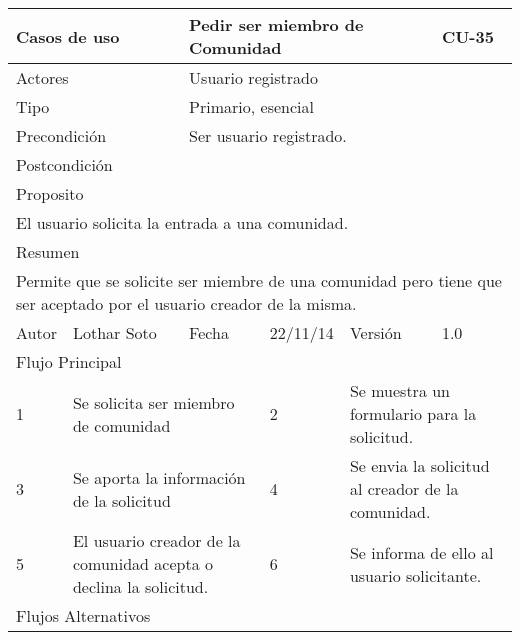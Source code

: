 \documentclass{article}
\begin{document}
\begin{table}[h]
\begin{tabular}{|l|l|l|l|l|l|}
\hline
\multicolumn{2}{|p{2cm}|}{Casos de uso}  & \multicolumn{3}{p{7cm}|}{Pedir ser miembro de Comunidad} & CU-35 \\
\hline
\multicolumn{2}{|p{2cm}|}{Actores}       & \multicolumn{4}{p{8cm}|}{Usuario registrado}        \\
\hline
\multicolumn{2}{|p{2cm}|}{Tipo}          & \multicolumn{4}{p{8cm}|}{Primario, esencial}        \\
\hline
\multicolumn{2}{|p{2cm}|}{Precondición}  & \multicolumn{4}{p{8cm}|}{Ser usuario registrado.}        \\
\hline
\multicolumn{2}{|p{2cm}|}{Postcondición} & \multicolumn{4}{p{8cm}|}{}        \\
\hline
\multicolumn{6}{|p{10cm}|}{Proposito}                                   \\
\hline
\multicolumn{6}{|p{10cm}|}{El usuario solicita la entrada a una comunidad.}                                            \\
\hline
\multicolumn{6}{|p{10cm}|}{Resumen}                                 \\
\hline
\multicolumn{6}{|p{10cm}|}{Permite que se solicite ser miembre de una comunidad pero tiene que ser aceptado por el usuario creador de la misma.}                                            \\
\hline
Autor         &       Lothar Soto        &  Fecha   &  22/11/14   &   Versión  & 1.0\\
\hline
\multicolumn{6}{|p{10cm}|}{Flujo Principal}\\
\hline
\multicolumn{1}{|p{1cm}|}{1} & \multicolumn{2}{p{3cm}}{Se solicita ser miembro de comunidad} & \multicolumn{1}{|p{1cm}|}{2} & \multicolumn{2}{p{3cm}|}{Se muestra un formulario para la solicitud.}\\
\hline
\multicolumn{1}{|p{1cm}|}{3} & \multicolumn{2}{p{3cm}}{Se aporta la información de la solicitud} & \multicolumn{1}{|p{1cm}|}{4} & \multicolumn{2}{p{3cm}|}{Se envia la solicitud al creador de la comunidad.}\\
\hline
\multicolumn{1}{|p{1cm}|}{5} & \multicolumn{2}{p{3cm}}{El usuario creador de la comunidad acepta o declina la solicitud.} & \multicolumn{1}{|p{1cm}|}{6} & \multicolumn{2}{p{3cm}|}{Se informa de ello al usuario solicitante.}\\
\hline
\multicolumn{6}{|p{10cm}|}{Flujos Alternativos}\\
\hline

\end{tabular}
\end{table}
\end{document}

